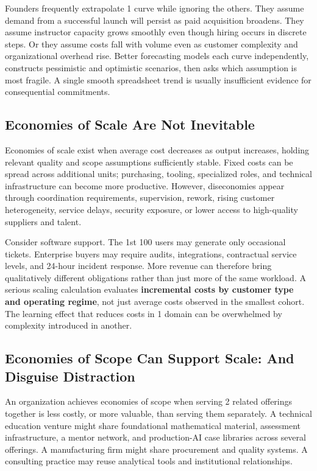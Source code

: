 Founders frequently extrapolate 1 curve while ignoring the others. They assume demand from a successful launch will persist as paid acquisition broadens. They assume instructor capacity grows smoothly even though hiring occurs in discrete steps. Or they assume costs fall with volume even as customer complexity and organizational overhead rise. Better forecasting models each curve independently, constructs pessimistic and optimistic scenarios, then asks which assumption is most fragile. A single smooth spreadsheet trend is usually insufficient evidence for consequential commitments.

\subsection{Economies of Scale Are Not Inevitable}
\label{sec:economies_scale_not_inevitable}

Economies of scale exist when average cost decreases as output increases, holding relevant quality and scope assumptions sufficiently stable. Fixed costs can be spread across additional units; purchasing, tooling, specialized roles, and technical infrastructure can become more productive. However, diseconomies appear through coordination requirements, supervision, rework, rising customer heterogeneity, service delays, security exposure, or lower access to high-quality suppliers and talent.

Consider software support. The 1st 100 users may generate only occasional tickets. Enterprise buyers may require audits, integrations, contractual service levels, and 24-hour incident response. More revenue can therefore bring qualitatively different obligations rather than just more of the same workload. A serious scaling calculation evaluates \textbf{incremental costs by customer type and operating regime}, not just average costs observed in the smallest cohort. The learning effect that reduces costs in 1 domain can be overwhelmed by complexity introduced in another.

\subsection{Economies of Scope Can Support Scale: And Disguise Distraction}
\label{sec:economies_scope_support_distraction}

An organization achieves economies of scope when serving 2 related offerings together is less costly, or more valuable, than serving them separately. A technical education venture might share foundational mathematical material, assessment infrastructure, a mentor network, and production-AI case libraries across several offerings. A manufacturing firm might share procurement and quality systems. A consulting practice may reuse analytical tools and institutional relationships.

